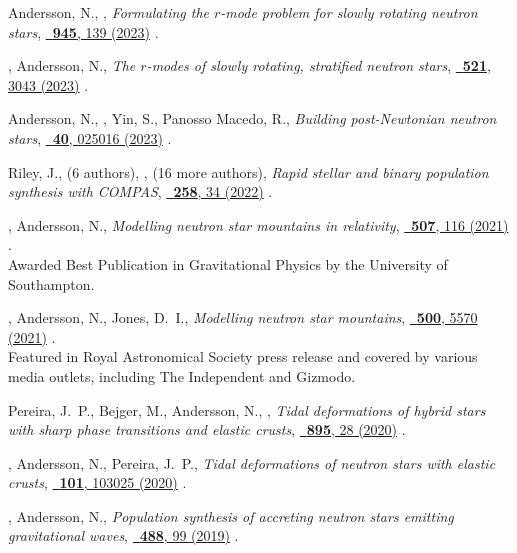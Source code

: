 \begin{publist}
    \item Andersson, N., \fgittins,
    \textit{Formulating the $r$-mode problem for slowly rotating neutron stars},
    \href{https://doi.org/10.3847/1538-4357/acbc1e}%
    {\apj\ \textbf{945}, 139 (2023)}
    .
    \item \fgittins, Andersson, N.,
    \textit{The $r$-modes of slowly rotating, stratified neutron stars},
    \href{https://doi.org/10.1093/mnras/stad672}%
    {\mnras\ \textbf{521}, 3043 (2023)}
    .
    \item Andersson, N., \fgittins, \advisedStudent{}Yin, S., Panosso Macedo, R.,
    \textit{Building post-Newtonian neutron stars},
    \href{https://doi.org/10.1088/1361-6382/acace5}%
    {\cqg\ \textbf{40}, 025016 (2023)}
    .
    \item Riley, J., (6 authors), \fgittins, (16 more authors),
    \textit{Rapid stellar and binary population synthesis with COMPAS},
    \href{https://doi.org/10.3847/1538-4365/ac416c}%
    {\apjs\ \textbf{258}, 34 (2022)}
    .
    \item \fgittins, Andersson, N.,
    \textit{Modelling neutron star mountains in relativity},
    \href{https://doi.org/10.1093/mnras/stab2048}%
    {\mnras\ \textbf{507}, 116 (2021)}
    . \\
    Awarded Best Publication in Gravitational Physics by the University of Southampton.
    \item \fgittins, Andersson, N., Jones, D.~I.,
    \textit{Modelling neutron star mountains},
    \href{https://doi.org/10.1093/mnras/staa3635}%
    {\mnras\ \textbf{500}, 5570 (2021)}
    . \\
    Featured in Royal Astronomical Society press release and covered by various media outlets, including The Independent and Gizmodo.
    \item Pereira, J.~P., Bejger, M., Andersson, N., \fgittins,
    \textit{Tidal deformations of hybrid stars with sharp phase transitions and
    elastic crusts},
    \href{https://doi.org/10.3847/1538-4357/ab8aca}%
    {\apj\ \textbf{895}, 28 (2020)}
    .
    \item \fgittins, Andersson, N., Pereira, J.~P.,
    \textit{Tidal deformations of neutron stars with elastic crusts},
    \href{https://doi.org/10.1103/PhysRevD.101.103025}%
    {\prd\ \textbf{101}, 103025 (2020)}
    .
    \item \fgittins, Andersson, N.,
    \textit{Population synthesis of accreting neutron stars emitting
    gravitational waves},
    \href{https://doi.org/10.1093/mnras/stz1719}%
    {\mnras\ \textbf{488}, 99 (2019)}
    .
\end{publist}

